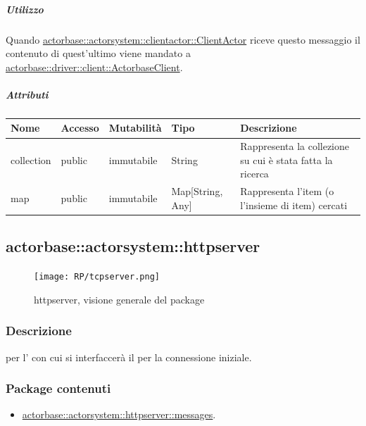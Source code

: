 \documentclass{scalatekids-article}
\begin{document}
\subparagraph{Utilizzo}

Quando \hyperref[sec:actorbase::actorsystem::clientactor::ClientActor]{actorbase::actorsystem::clientactor::ClientActor}
riceve questo messaggio il contenuto di quest'ultimo viene
mandato a \hyperref[sec:actorbase::driver::client::ActorbaseClient]{actorbase::driver::\allowbreak{}client::\allowbreak{}ActorbaseClient}.

\subparagraph{Attributi}
\begin{tabular}{| p{3cm} | p{1.5cm} | p{2cm} | p{2cm} | p{8.5cm} |}
  \hline
  Nome & Accesso & Mutabilità & Tipo & Descrizione\\
  \hline
  collection & public & immutabile & String & Rappresenta la collezione su cui è stata fatta la ricerca \\
  \hline
  map & public & immutabile & Map[String, Any] & Rappresenta l'item (o l'insieme di item) cercati \\
  \hline
\end{tabular}


\subsection{actorbase::actorsystem::httpserver} %
\label{sec:actorbase::actorsystem::httpserver}

\begin{figure}[H]
  \begin{center}
    \texttt{[image: RP/tcpserver.png]} %
    \caption{httpserver, visione generale del package}
  \end{center}
\end{figure}

\subsubsection{Descrizione}
 per l' con cui si interfaccerà il  per la connessione iniziale.

\subsubsection{Package contenuti}
\begin{itemize}
\item \hyperref[sec:actorbase::actorsystem::httpserver::messages]{actorbase::actorsystem::httpserver::messages}.
\end{itemize}
\end{document}
